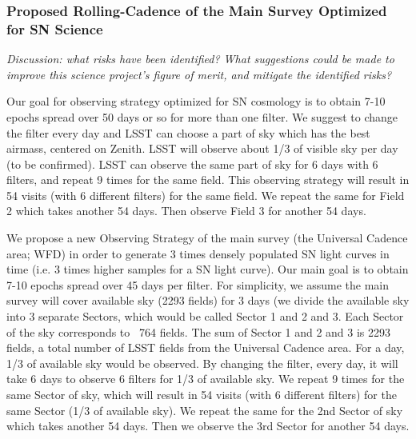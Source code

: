 \subsubsection{Proposed Rolling-Cadence of the Main Survey Optimized for SN Science }

{\it Discussion: what risks have been identified? What suggestions could be
made to improve this science project's figure of merit, and mitigate
the identified risks?}

Our goal for observing strategy optimized for SN cosmology is to
obtain 7-10 epochs spread over 50 days or so for more than one filter. We suggest to
change the filter every day and LSST can choose a part of sky which has the best airmass,
centered on Zenith. LSST will observe about 1/3 of visible sky per day (to be confirmed).
LSST can observe the same part of sky for 6 days with 6 filters, and repeat 9 times for
the same field. This observing strategy will result in 54 visits (with 6 different
filters) for the same field. We repeat the same for Field 2 which takes another 54 days.
Then observe Field 3 for another 54 days.

We propose a new Observing Strategy of the main survey (the Universal Cadence area;
WFD) in order to generate 3 times densely populated SN light curves in time (i.e. 3
times higher samples for a SN light curve). Our main goal is to obtain 7-10 epochs
spread over 45 days per filter. For simplicity, we assume the main survey will cover
available sky (2293 fields) for 3 days (we divide the available sky into 3 separate
Sectors, which would be called Sector 1 and 2 and 3. Each Sector of the sky
corresponds to ~764 fields. The sum of Sector 1 and 2 and 3 is 2293 fields, a total
number of LSST fields from the Universal Cadence area. For a day, 1/3 of available
sky would be observed. By changing the filter, every day, it will take 6 days to
observe 6 filters for 1/3 of available sky. We repeat 9 times for the same Sector of
sky, which will result in 54 visits (with 6 different filters) for the same Sector
(1/3 of available sky). We repeat the same for the 2nd Sector of sky which takes
another 54 days. Then we observe the 3rd Sector for another 54 days.

